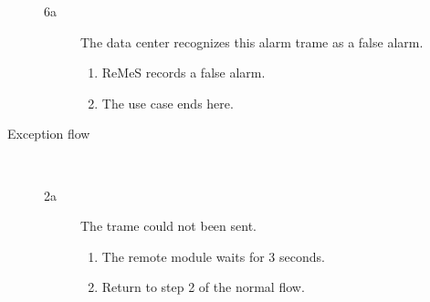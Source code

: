 \begin{description}
\begin{description}
\begin{enumerate}
			\end{enumerate}
		\item[6a] The data center recognizes this alarm trame as a false alarm.
		\begin{enumerate}
			\item ReMeS records a false alarm.
			\item The use case ends here. 
		\end{enumerate}
	\end{description}
	\item[Exception flow] \ 
	\begin{description}
		\item[2a] The trame could not been sent. 
		\begin{enumerate}
			\item The remote module waits for 3 seconds.
			\item Return to step 2 of the normal flow.
		\end{enumerate}
	\end{description}
\end{description}